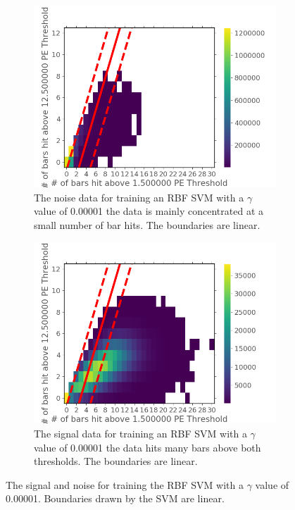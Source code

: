\begin{figure}[H]
\centering
\begin{subfigure}{.5\textwidth}
  \centering
  \includegraphics[width=\linewidth]{Chapter4/Figs/Raster/svmLinAndRbf/noiseNeutronRbfSVMg0.00001.png}
  \captionsetup{width=.9\linewidth}
  \caption{The noise data for training an RBF SVM with a $\gamma$ value of 0.00001 the data is mainly concentrated at a small number of bar hits. The boundaries are linear.}
  \label{subFig:noiseNeutronRbfSVMg0.000001}
\end{subfigure}%
\begin{subfigure}{.5\textwidth}
  \centering
  \includegraphics[width=\linewidth]{Chapter4/Figs/Raster/svmLinAndRbf/signalNeutronRbfSVMg0.00001.png}
  \captionsetup{width=.9\linewidth}
  \caption{The signal data for training an RBF SVM with a $\gamma$ value of 0.00001 the data hits many bars above both thresholds. The boundaries are linear.}
  \label{subFig:signalNeutronRbfSVMg0.00001}
\end{subfigure}
\caption{The signal and noise for training the RBF SVM with a $\gamma$ value of 0.00001. Boundaries drawn by the SVM are linear.}
\label{fig:signalAndNoiseNeutronRbfSVMg0.00001}
\end{figure}

